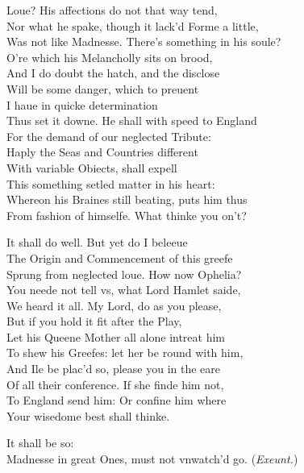 \documentclass[a5paper,DIV=calc,11pt]{scrbook}
\begin{document}
\begin{drama*}
    \kingspeaks Loue? His affections do not that way tend,\\
    Nor what he spake, though it lack'd Forme a little,\\
    Was not like Madnesse. There's something in his soule?\\
    O're which his Melancholly sits on brood,\\
    And I do doubt the hatch, and the disclose\\
    Will be some danger, which to preuent\\
    I haue in quicke determination\\
    Thus set it downe. He shall with speed to England\\
    For the demand of our neglected Tribute:\\
    Haply the Seas and Countries different\\
    With variable Obiects, shall expell\\
    This something setled matter in his heart:\\
    Whereon his Braines still beating, puts him thus\\
    From fashion of himselfe. What thinke you on't?
    
    \polspeaks It shall do well. But yet do I beleeue\\
    The Origin and Commencement of this greefe\\
    Sprung from neglected loue. How now Ophelia?\\
    You neede not tell vs, what Lord Hamlet saide,\\
    We heard it all. My Lord, do as you please,\\
    But if you hold it fit after the Play,\\
    Let his Queene Mother all alone intreat him\\
    To shew his Greefes: let her be round with him,\\
    And Ile be plac'd so, please you in the eare\\
    Of all their conference. If she finde him not,\\
    To England send him: Or confine him where\\
    Your wisedome best shall thinke.
    
    \kingspeaks It shall be so:\\
    Madnesse in great Ones, must not vnwatch'd go. \hfill(\textit{Exeunt.})
\end{drama*}

\scene
\end{document}
